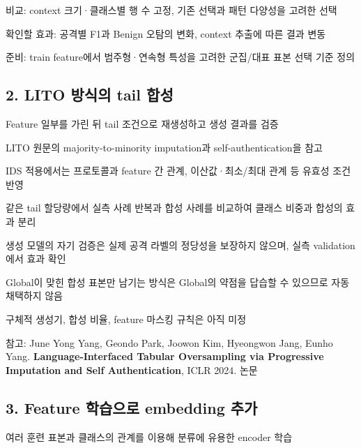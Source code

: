 \par\noindent \textbullet\enspace 비교: context 크기·클래스별 행 수 고정, 기존 선택과 패턴 다양성을 고려한 선택


\par\noindent \textbullet\enspace 확인할 효과: 공격별 F1과 Benign 오탐의 변화, context 추출에 따른 결과 변동


\par\noindent \textbullet\enspace 준비: train feature에서 범주형·연속형 특성을 고려한 군집/\allowbreak{}대표 표본 선택 기준 정의


\subsection{2. LITO 방식의 tail 합성}
\par\noindent \textbullet\enspace Feature 일부를 가린 뒤 tail 조건으로 재생성하고 생성 결과를 검증


\par\noindent \textbullet\enspace LITO 원문의 majority-to-minority imputation과 self-authentication을 참고


\par\noindent \textbullet\enspace IDS 적용에서는 프로토콜과 feature 간 관계, 이산값·최소/\allowbreak{}최대 관계 등 유효성 조건 반영


\par\noindent \textbullet\enspace 같은 tail 할당량에서 실측 사례 반복과 합성 사례를 비교하여 클래스 비중과 합성의 효과 분리


\par\noindent \textbullet\enspace 생성 모델의 자기 검증은 실제 공격 라벨의 정당성을 보장하지 않으며, 실측 validation에서 효과 확인


\par\noindent \textbullet\enspace Global이 맞힌 합성 표본만 남기는 방식은 Global의 약점을 답습할 수 있으므로 자동 채택하지 않음


\par\noindent \textbullet\enspace 구체적 생성기, 합성 비율, feature 마스킹 규칙은 아직 미정


참고: June Yong Yang, Geondo Park, Joowon Kim, Hyeongwon Jang, Eunho Yang. \textbf{Language-Interfaced Tabular Oversampling via Progressive Imputation and Self Authentication}, ICLR 2024. 논문

\subsection{3. Feature 학습으로 embedding 추가}
\par\noindent \textbullet\enspace 여러 훈련 표본과 클래스의 관계를 이용해 분류에 유용한 encoder 학습


